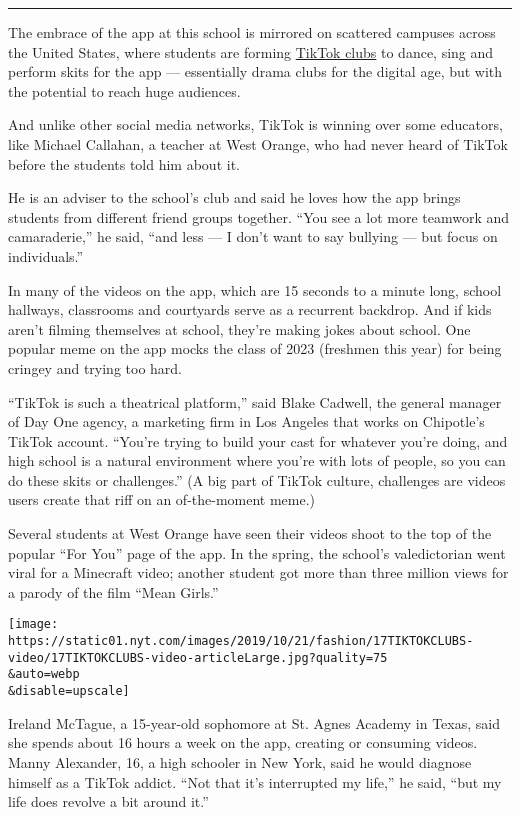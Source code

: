 \begin{center}\rule{0.5\linewidth}{\linethickness}\end{center}

The embrace of the app at this school is mirrored on scattered campuses
across the United States, where students are forming
\href{http://vm.tiktok.com/5q73YA/}{TikTok clubs} to dance, sing and
perform skits for the app --- essentially drama clubs for the digital
age, but with the potential to reach huge audiences.

And unlike other social media networks, TikTok is winning over some
educators, like Michael Callahan, a teacher at West Orange, who had
never heard of TikTok before the students told him about it.

He is an adviser to the school's club and said he loves how the app
brings students from different friend groups together. ``You see a lot
more teamwork and camaraderie,'' he said, ``and less --- I don't want to
say bullying --- but focus on individuals.''

In many of the videos on the app, which are 15 seconds to a minute long,
school hallways, classrooms and courtyards serve as a recurrent
backdrop. And if kids aren't filming themselves at school, they're
making jokes about school. One popular meme on the app mocks the class
of 2023 (freshmen this year) for being cringey and trying too hard.

``TikTok is such a theatrical platform,'' said Blake Cadwell, the
general manager of Day One agency, a marketing firm in Los Angeles that
works on Chipotle's TikTok account. ``You're trying to build your cast
for whatever you're doing, and high school is a natural environment
where you're with lots of people, so you can do these skits or
challenges.'' (A big part of TikTok culture, challenges are videos users
create that riff on an of-the-moment meme.)

Several students at West Orange have seen their videos shoot to the top
of the popular ``For You'' page of the app. In the spring, the school's
valedictorian went viral for a Minecraft video; another student got more
than three million views for a parody of the film ``Mean Girls.''

\texttt{[image: https://static01.nyt.com/images/2019/10/21/fashion/17TIKTOKCLUBS-video/17TIKTOKCLUBS-video-articleLarge.jpg?quality=75\\\&auto=webp\\\&disable=upscale]}

Ireland McTague, a 15-year-old sophomore at St. Agnes Academy in Texas,
said she spends about 16 hours a week on the app, creating or consuming
videos. Manny Alexander, 16, a high schooler in New York, said he would
diagnose himself as a TikTok addict. ``Not that it's interrupted my
life,'' he said, ``but my life does revolve a bit around it.''

